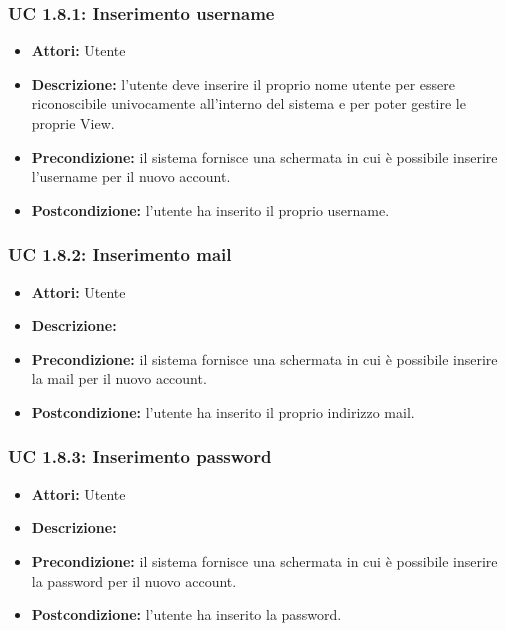 \subsubsection{UC 1.8.1: Inserimento username}

\begin{itemize}
    \item \textbf{Attori:} Utente
    \item \textbf{Descrizione:} l'utente deve inserire il proprio nome utente per essere riconoscibile univocamente all'interno del sistema e per poter gestire le proprie View.
    \item \textbf{Precondizione:} il sistema fornisce una schermata in cui è possibile inserire l'username per il nuovo account.
    \item \textbf{Postcondizione:} l'utente ha inserito il proprio username.
\end{itemize}

\subsubsection{UC 1.8.2: Inserimento mail}

\begin{itemize}
    \item \textbf{Attori:} Utente
    \item \textbf{Descrizione:}
    \item \textbf{Precondizione:} il sistema fornisce una schermata in cui è possibile inserire la mail per il nuovo account.
    \item \textbf{Postcondizione:} l'utente ha inserito il proprio indirizzo mail.
\end{itemize}

\subsubsection{UC 1.8.3: Inserimento password}

\begin{itemize}
    \item \textbf{Attori:} Utente
    \item \textbf{Descrizione:}
    \item \textbf{Precondizione:} il sistema fornisce una schermata in cui è possibile inserire la password per il nuovo account.
    \item \textbf{Postcondizione:} l'utente ha inserito la password.
\end{itemize}


